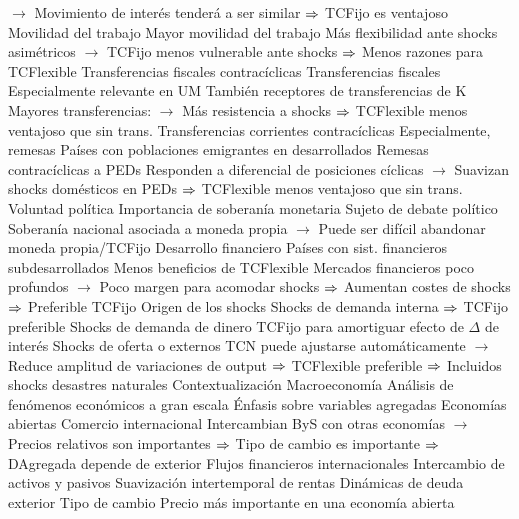 \documentclass{nuevotema}
\begin{document}
\begin{esquemal}
				\4[] $\to$ Movimiento de interés tenderá a ser similar
				\4[] $\Rightarrow$ TCFijo es ventajoso
			\3[\textsc{iv}] Movilidad del trabajo
				\4 Mayor movilidad del trabajo
				\4[] Más flexibilidad ante shocks asimétricos
				\4[] $\to$ TCFijo menos vulnerable ante shocks
				\4[] $\Rightarrow$ Menos razones para TCFlexible
			\3[\textsc{v}] Transferencias fiscales contracíclicas
				\4 Transferencias fiscales
				\4[] Especialmente relevante en UM
				\4[] También receptores de transferencias de K
				\4[] Mayores transferencias:
				\4[] $\to$ Más resistencia a shocks
				\4[] $\Rightarrow$ TCFlexible menos ventajoso que sin trans.
			\3[\textsc{vi}] Transferencias corrientes contracíclicas
				\4 Especialmente, remesas
				\4 Países con poblaciones emigrantes en desarrollados
				\4[] Remesas contracíclicas a PEDs
				\4[] Responden a diferencial de posiciones cíclicas
				\4[] $\to$ Suavizan shocks domésticos en PEDs
				\4[] $\Rightarrow$ TCFlexible menos ventajoso que sin trans.
			 Voluntad política
				\4 Importancia de soberanía monetaria
				\4[] Sujeto de debate político
				\4[] Soberanía nacional asociada a moneda propia 
				\4[] $\to$ Puede ser difícil abandonar moneda propia/TCFijo
			 Desarrollo financiero
				\4 Países con sist. financieros subdesarrollados
				\4[] Menos beneficios de TCFlexible
				\4[] Mercados financieros poco profundos
				\4[] $\to$ Poco margen para acomodar shocks
				\4[] $\Rightarrow$ Aumentan costes de shocks
				\4[] $\Rightarrow$ Preferible TCFijo
			\3[\textsc{ix}] Origen de los shocks
				\4 Shocks de demanda interna
				\4[] $\Rightarrow$ TCFijo preferible
				\4 Shocks de demanda de dinero
				\4[] TCFijo para amortiguar efecto de $\Delta$ de interés
				\4 Shocks de oferta o externos
				\4[] TCN puede ajustarse automáticamente
				\4[] $\to$ Reduce amplitud de variaciones de output
				\4[] $\Rightarrow$ TCFlexible preferible
				\4[] $\Rightarrow$ Incluidos shocks desastres naturales
	\1[] 
		\2 Contextualización
			\3 Macroeconomía
				\4 Análisis de fenómenos económicos a gran escala
				\4 Énfasis sobre variables agregadas
			\3 Economías abiertas
				\4 Comercio internacional
				\4[] Intercambian ByS con otras economías
				\4[] $\to$ Precios relativos son importantes
				\4[] $\Rightarrow$ Tipo de cambio es importante
				\4[] $\Rightarrow$ DAgregada depende de exterior
				\4 Flujos financieros internacionales
				\4[] Intercambio de activos y pasivos
				\4[] Suavización intertemporal de rentas
				\4[] Dinámicas de deuda exterior
				\4 Tipo de cambio
				\4[] Precio más importante en una economía abierta

\end{esquemal}
\end{document}
